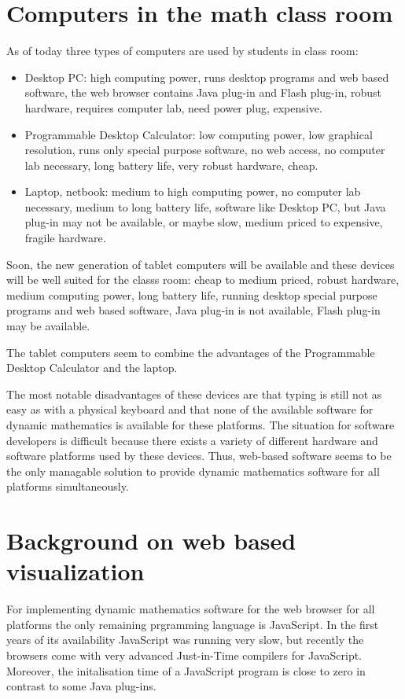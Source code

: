 \documentclass[12pt,a4paper]{article}%
\begin{document}
\section{Computers in the math class room}
As of today three types of computers are used by students in class room:
\begin{itemize}
\item Desktop PC: high computing power, runs desktop programs and web based software, 
the web browser contains Java plug-in and Flash plug-in, robust hardware,
requires computer lab, need power plug, expensive.
\item Programmable Desktop Calculator: low computing power, low graphical resolution, runs only
special purpose software, no web access, no computer lab necessary, long battery life, 
very robust hardware, cheap.
\item Laptop, netbook: medium to high computing power, no computer lab necessary, 
medium to long battery life, software like Desktop PC, but Java plug-in may not be available, or maybe slow,
medium priced to expensive, fragile hardware.
\end{itemize}
Soon, the new generation of tablet computers will be available and these devices will be
well suited for the classs room: cheap to medium priced, robust hardware, medium
computing power, long battery life, running desktop special purpose programs and web based software,
Java plug-in is not available, Flash plug-in may be available.

The tablet computers seem to combine the advantages of the Programmable Desktop Calculator 
and the laptop. 

The most notable disadvantages of these devices are that typing is still not as easy 
as with a physical keyboard and that none of the available software for 
dynamic mathematics is available for these platforms.
The situation for software developers is difficult because there exists a variety
of different hardware and software platforms used by these devices. Thus, 
web-based software seems to be the only managable solution to provide 
dynamic mathematics software for all platforms simultaneously.

\section{Background on web based visualization}
For implementing dynamic mathematics software for the web browser for all platforms 
the only remaining prgramming language is JavaScript. In the first years of its availability
JavaScript was running very slow, but recently the browsers come with very advanced
Just-in-Time compilers for JavaScript. Moreover, the initalisation time of a 
JavaScript program is close to zero in contrast to some Java plug-ins.
\end{document}
